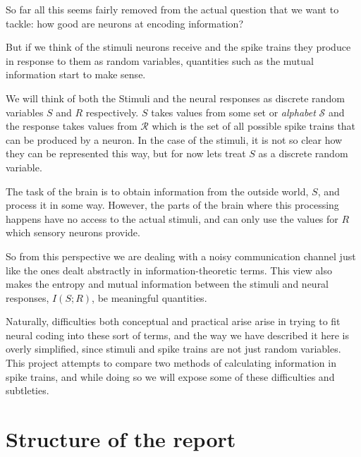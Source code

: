 \documentclass[10pt,a4paper]{book}
\begin{document}
So far all this seems fairly removed from the actual question that we want to tackle: how good are neurons at encoding information?

But if we think of the stimuli neurons receive and the spike trains they produce in response to them as random variables, quantities such as the mutual information start to make sense.

We will think of both the Stimuli and the neural responses as discrete random variables $S$ and $R$ respectively. $S$ takes values from some set or \emph{alphabet} $\mathcal{S}$ and the response takes values from $\mathcal{R}$ which is the set of all possible spike trains that can be produced by a neuron. In the case of the stimuli, it is not so clear how they can be represented this way, but for now lets treat $S$ as a discrete random variable.

The task of the brain is to obtain information from the outside world, $S$, and process it in some way. However, the  parts of the brain where this processing happens have no access to the actual stimuli, and can only use the values for $R$  which sensory neurons provide.

So from this perspective we are dealing with a noisy communication channel just like the ones dealt abstractly in information-theoretic terms. This view also makes the entropy and mutual information between the stimuli and neural responses, $I(S;R)$, be meaningful quantities.

Naturally, difficulties both conceptual and practical arise arise in trying to fit neural coding into these sort of terms, and the way we have described it here is overly simplified, since stimuli and spike trains are not just random variables. This project attempts to compare two methods of calculating information in spike trains, and while doing so we will expose some of these difficulties and subtleties.
\section{Structure of the report}
\end{document}
